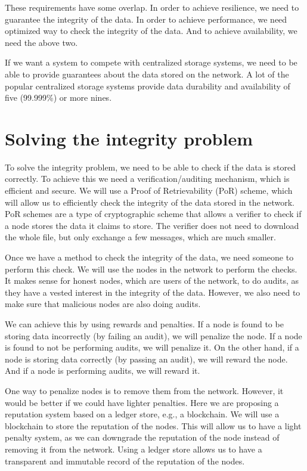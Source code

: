These requirements have some overlap.
In order to achieve resilience, we need to guarantee the integrity of the data.
In order to achieve performance, we need optimized way to check the integrity of the data.
And to achieve availability, we need the above two.

If we want a system to compete with centralized storage systems, we
need to be able to provide guarantees about the data stored on the network.
A lot of the popular centralized storage systems provide data durability and
availability of five (99.999\%) or more nines.

\section{Solving the integrity problem}


To solve the integrity problem, we need to be able to check if the data is stored correctly.
To achieve this we need a verification/auditing mechanism, which is efficient and secure.
We will use a Proof of Retrievability (PoR) scheme, which will allow us to efficiently check the 
integrity of the data stored in the network.
PoR schemes are a type of cryptographic scheme that allows a verifier to check if a node
stores the data it claims to store.
The verifier does not need to download the whole file, but only exchange a few messages, which are much smaller.

Once we have a method to check the integrity of the data, we need someone to perform this check.
We will use the nodes in the network to perform the checks.
It makes sense for honest nodes, which are users of the network, to do audits,
as they have a vested interest in the integrity of the data.
However, we also need to make sure that malicious nodes are also doing audits.

We can achieve this by using rewards and penalties.
If a node is found to be storing data incorrectly (by failing an audit), we will penalize the node.
If a node is found to not be performing audits, we will penalize it.
On the other hand, if a node is storing data correctly (by passing an audit), we will reward the node.
And if a node is performing audits, we will reward it.

One way to penalize nodes is to remove them from the network.
However, it would be better if we could have lighter penalties.
Here we are proposing a reputation system based on a ledger store, e.g., a blockchain.
We will use a blockchain to store the reputation of the nodes.
This will allow us to have a light penalty system, as we can downgrade the reputation of the node
instead of removing it from the network.
Using a ledger store allows us to have a transparent and immutable record of the reputation of the nodes.

